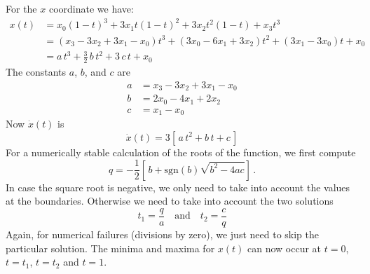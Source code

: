 \documentclass{article}
\begin{document}
For the $x$ coordinate we have:
\begin{align}
  x(t) & = x_0(1-t)^3 + 3x_1t(1-t)^2 + 3x_2t^2(1-t) + x_3 t^3\\
       & = (x_3-3x_2+3x_1-x_0)t^3 + (3x_0-6x_1+3x_2)t^2 + (3x_1-3x_0)t + x_0\\
       & = a\,t^3 + \frac{3}{2}\,b\,t^2 + 3\,c\,t + x_0
\end{align}
%
The constants $a$, $b$, and $c$ are
%
\begin{align}
  a & = x_3-3x_2+3x_1-x_0 \\
  b & = 2x_0-4x_1+2x_2 \\
  c & = x_1-x_0
\end{align}
%
Now $\dot x(t)$ is
%
\begin{equation}
  \dot x(t) = 3\left[\,a\,t^2 + b\,t + c\,\right]
\end{equation}
%
For a numerically stable calculation of the roots of the function, we
first compute
%
\begin{equation}
  q = -\frac{1}{2}\left[\,b+\mathrm{sgn}(b)\sqrt{b^2-4ac}\right]\, .
\end{equation}
%
In case the square root is negative, we only need to take into account
the values at the boundaries. Otherwise we need to take into account
the two solutions
%
\begin{equation}
  t_1 = \frac{q}{a} \quad\text{and}\quad t_2 = \frac{c}{q}
\end{equation}
%
Again, for numerical failures (divisions by zero), we just need to skip
the particular solution. The minima and maxima for $x(t)$ can now
occur at $t=0$, $t=t_1$, $t=t_2$ and $t=1$.
\end{document}
